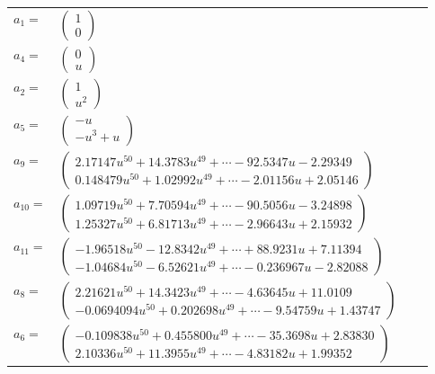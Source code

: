 \documentclass[1p]{elsarticle_modified}
\theoremstyle{definition}
\begin{document}
\begin{tabular}{m{7pt} m{180pt} m{7pt} m{180pt} }
\flushright $a_{1}=$&$\begin{pmatrix}1\\0\end{pmatrix}$ \\
\flushright $a_{4}=$&$\begin{pmatrix}0\\u\end{pmatrix}$ \\
\flushright $a_{2}=$&$\begin{pmatrix}1\\u^2\end{pmatrix}$ \\
\flushright $a_{5}=$&$\begin{pmatrix}- u\\- u^3+u\end{pmatrix}$ \\
\flushright $a_{9}=$&$\begin{pmatrix}2.17147 u^{50}+14.3783 u^{49}+\cdots-92.5347 u-2.29349\\0.148479 u^{50}+1.02992 u^{49}+\cdots-2.01156 u+2.05146\end{pmatrix}$ \\
\flushright $a_{10}=$&$\begin{pmatrix}1.09719 u^{50}+7.70594 u^{49}+\cdots-90.5056 u-3.24898\\1.25327 u^{50}+6.81713 u^{49}+\cdots-2.96643 u+2.15932\end{pmatrix}$ \\
\flushright $a_{11}=$&$\begin{pmatrix}-1.96518 u^{50}-12.8342 u^{49}+\cdots+88.9231 u+7.11394\\-1.04684 u^{50}-6.52621 u^{49}+\cdots-0.236967 u-2.82088\end{pmatrix}$ \\
\flushright $a_{8}=$&$\begin{pmatrix}2.21621 u^{50}+14.3423 u^{49}+\cdots-4.63645 u+11.0109\\-0.0694094 u^{50}+0.202698 u^{49}+\cdots-9.54759 u+1.43747\end{pmatrix}$ \\
\flushright $a_{6}=$&$\begin{pmatrix}-0.109838 u^{50}+0.455800 u^{49}+\cdots-35.3698 u+2.83830\\2.10336 u^{50}+11.3955 u^{49}+\cdots-4.83182 u+1.99352\end{pmatrix}$ \\

\end{tabular}
\end{document}
